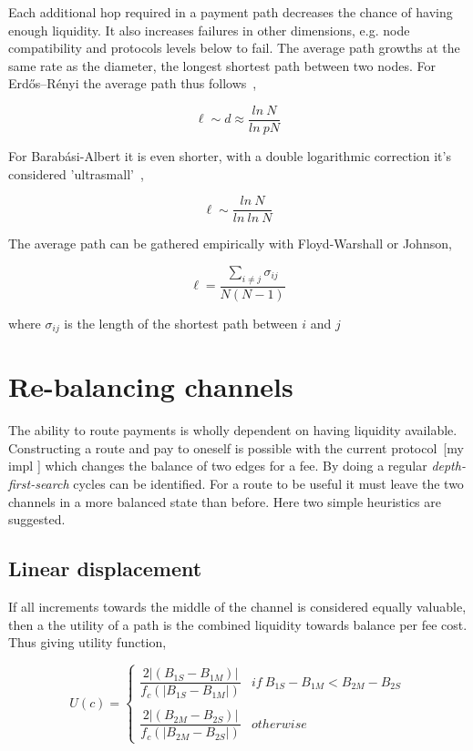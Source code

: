 Each additional hop required in a payment path decreases the chance of having enough liquidity. It also increases failures in other dimensions, e.g. node compatibility and protocols levels below to fail. The average path growths at the same rate as the diameter, the longest shortest path between two nodes. For Erdős–Rényi the average path thus follows~\cite{watts:stragatz:small:networks},

\[ \ell \sim d \approx \dfrac{ln~N}{ln~pN} \]

For Barabási-Albert it is even shorter, with a double logarithmic correction it's considered 'ultrasmall'~\cite{cohen:havlin:ultrasmall},

\[ \ell \sim \dfrac{ln~N}{ln~ln~N} \]

The average path can be gathered empirically with Floyd-Warshall or Johnson,

\[ \ell = \dfrac{\sum_{i \neq j} \sigma_{ij}}{N(N-1)} \]

where $\sigma_{ij}$ is the length of the shortest path between $i$ and $j$

\section{Re-balancing channels}

The ability to route payments is wholly dependent on having liquidity available. Constructing a route and pay to oneself is possible with the current protocol~[my impl ] which changes the balance of two edges for a fee. By doing a regular \textit{depth-first-search} cycles can be identified. For a route to be useful it must leave the two channels in a more balanced state than before. Here two simple heuristics are suggested. 

\subsection{Linear displacement}
\label{sec:linear:displacement}
If all increments towards the middle of the channel is considered equally valuable, then a the utility of a path is the combined liquidity towards balance per fee cost. Thus giving utility function,

\[ U(c) = \begin{cases} 
\dfrac{2|(B_{1S} - B_{1M})|}{f_c(|B_{1S} - B_{1M}|)}  & if~B_{1S} - B_{1M} < B_{2M} - B_{2S} \\ 
\\
\dfrac{2|(B_{2M} - B_{2S})|}{f_c(|B_{2M} - B_{2S}|)}  & otherwise
\end{cases} \]

